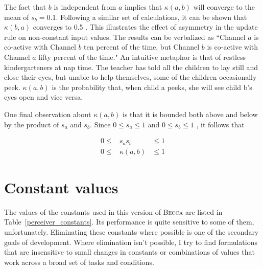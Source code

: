 The fact that $b$ is independent from $a$ implies that $\kappa(a, b)$ will converge to the mean of $s_b=0.1$. Following a similar set of calculations, it can be shown that $\kappa(b, a)$ converges to 0.5 . This illustrates the effect of asymmetry in the update rule on non-constant input values. The results can be verbalized as ``Channel $a$ is co-active with Channel $b$ ten percent of the time, but Channel $b$ is co-active with Channel $a$ fifty percent of the time." An intuitive metaphor is that of restless kindergarteners at nap time. The teacher has told all the children to lay still and close their eyes, but unable to help themselves, some of the children occasionally peek. $\kappa(a, b)$ is the probability that, when child a peeks, she will see child b's eyes open and vice versa.

One final observation about $\kappa(a, b)$ is that it is bounded both above and below by the product of $s_a$ and $s_b$. Since $0 \leq s_a \leq 1$ and $0 \leq s_b \leq 1$ ,  it follows that 

\begin{eqnarray}
0 \leq&s_a s_b&  \leq 1 \\
0 \leq&\kappa(a, b)&  \leq 1 
\end{eqnarray}


\section{Constant values}

The values of the constants used in this version of \textsc{Becca} are listed in Table~\ref{perceiver_constants}. Its performance is quite sensitive to some of them, unfortunately. Eliminating these constants where possible is one of the secondary goals of development. Where elimination isn't possible, I try to find formulations that are insensitive to small changes in constants or combinations of values that work across a broad set of tasks and conditions.

